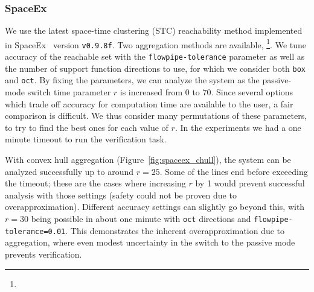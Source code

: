 \subsubsection{SpaceEx}

We use the latest space-time clustering (STC) reachability method implemented in SpaceEx~\cite{frehse2013flowpipe} version \texttt{v0.9.8f}.
%
Two aggregation methods are available, \footnote{}\new{)}.
%
We tune accuracy of the reachable set with the \texttt{flowpipe-tolerance} parameter as well as the number of support function directions to use, for which we consider
both \texttt{box} and \texttt{oct}.
%
By fixing the parameters, we can analyze the system as the passive-mode switch time parameter $r$ is increased from $0$ to $70$.
%
Since several options which trade off accuracy for computation time are available to the user, a fair comparison is difficult.
%
We thus consider many permutations of these parameters, to try to find the best ones for each value of $r$.
%
In the experiments we had a one minute timeout to run the verification task.

With convex hull aggregation (Figure~\ref{fig:spaceex_chull}), the system can be analyzed successfully up to around $r=25$.
%
Some of the lines end before exceeding the timeout; these are the cases where increasing $r$ by 1 would prevent
successful analysis with those settings (safety could not be proven due to overapproximation).
%
Different accuracy settings can slightly go beyond this, with $r=30$ being possible in about one minute with \texttt{oct} directions and
\texttt{flowpipe-tolerance=0.01}.
%
This demonstrates the inherent overapproximation due to aggregation, where even modest uncertainty in the switch to the passive mode
prevents verification.

